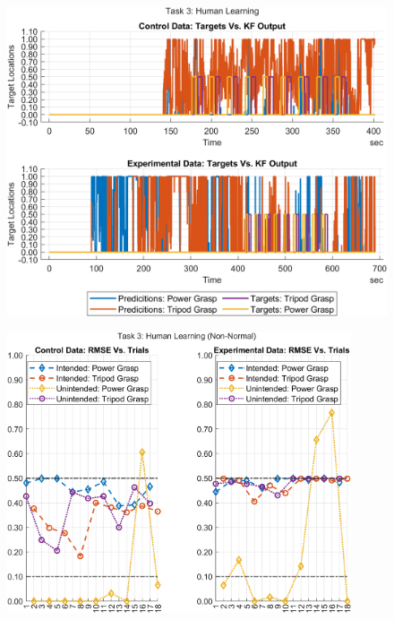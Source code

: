 \documentclass[12pt]{article}
\newcommand\figWidth{4in}
\newcommand\figWidthLarge{9.5in}
\begin{document}
    \begin{landscape}
    \begin{figure}
        \includegraphics[width = \figWidthLarge]{t3-kf-out.png}
    \end{figure}
    \end{landscape}
    \newpage \clearpage
    \begin{figure}
        \includegraphics[width = \figWidth]{t3-rmse-xnorm.png}
    \end{figure}
\end{document}
